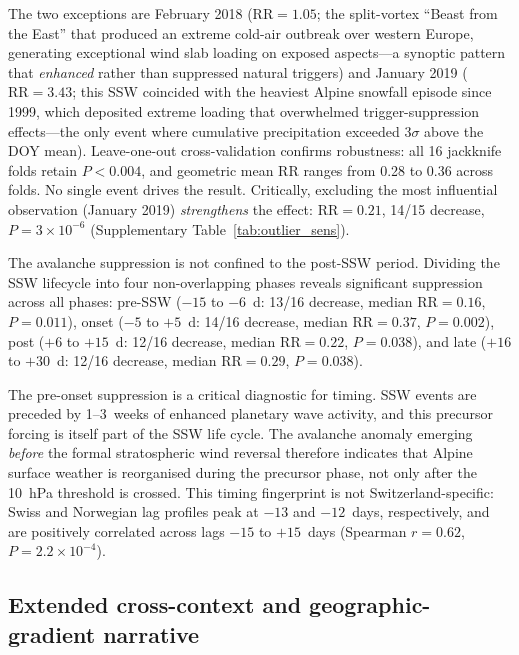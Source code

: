 \documentclass[11pt,letterpaper]{article}
\begin{document}
The two exceptions are February 2018 ($\mathrm{RR} = 1.05$; the split-vortex ``Beast from the East'' that produced an extreme cold-air outbreak over western Europe, generating exceptional wind slab loading on exposed aspects---a synoptic pattern that \emph{enhanced} rather than suppressed natural triggers) and January 2019 ($\mathrm{RR} = 3.43$; this SSW coincided with the heaviest Alpine snowfall episode since 1999, which deposited extreme loading that overwhelmed trigger-suppression effects---the only event where cumulative precipitation exceeded $3\sigma$ above the DOY mean). Leave-one-out cross-validation confirms robustness: all 16 jackknife folds retain $P < 0.004$, and geometric mean RR ranges from 0.28 to 0.36 across folds. No single event drives the result. Critically, excluding the most influential observation (January 2019) \emph{strengthens} the effect: $\mathrm{RR} = 0.21$, 14/15 decrease, $P = 3 \times 10^{-6}$ (Supplementary Table~\ref{tab:outlier_sens}).

The avalanche suppression is not confined to the post-SSW period. Dividing the SSW lifecycle into four non-overlapping phases reveals significant suppression across all phases: pre-SSW ($-15$ to $-6$~d: 13/16 decrease, median $\mathrm{RR} = 0.16$, $P = 0.011$), onset ($-5$ to $+5$~d: 14/16 decrease, median $\mathrm{RR} = 0.37$, $P = 0.002$), post ($+6$ to $+15$~d: 12/16 decrease, median $\mathrm{RR} = 0.22$, $P = 0.038$), and late ($+16$ to $+30$~d: 12/16 decrease, median $\mathrm{RR} = 0.29$, $P = 0.038$).

The pre-onset suppression is a critical diagnostic for timing. SSW events are preceded by 1--3~weeks of enhanced planetary wave activity\cite{Polvani2004}, and this precursor forcing is itself part of the SSW life cycle. The avalanche anomaly emerging \emph{before} the formal stratospheric wind reversal therefore indicates that Alpine surface weather is reorganised during the precursor phase, not only after the 10~hPa threshold is crossed. This timing fingerprint is not Switzerland-specific: Swiss and Norwegian lag profiles peak at $-13$ and $-12$~days, respectively, and are positively correlated across lags $-15$ to $+15$~days (Spearman $r = 0.62$, $P = 2.2 \times 10^{-4}$).

\subsection*{Extended cross-context and geographic-gradient narrative}
\end{document}
